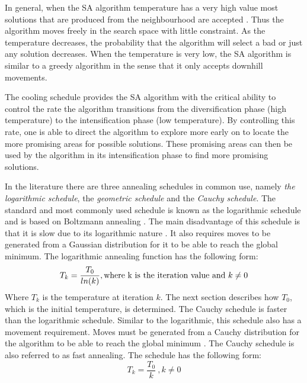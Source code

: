 In general, when the \gls{SA} algorithm temperature has a very high value most solutions that are produced from the neighbourhood are accepted \cite{ClusterSA}. Thus the algorithm moves freely in the search space with little constraint. As the temperature decreases, the probability that the algorithm will select a bad or just any solution decreases\cite{ClusterSA}. When the temperature is very low, the \gls{SA} algorithm is similar to a greedy algorithm in the sense that it only accepts downhill movements\cite{ClusterSA}.

The cooling schedule provides the \gls{SA} algorithm with the critical ability to control the rate the algorithm transitions from the diversification phase (high temperature) to the intensification phase (low temperature)\cite{ClusterSA}. By controlling this rate, one is able to direct the algorithm to explore more early on to locate the more promising areas for possible solutions. These promising areas can then be used by the algorithm in its intensification phase to find more promising solutions.

In the literature there are three annealing schedules in common use, namely \emph{the logarithmic schedule}, the \emph{geometric schedule} and the \emph{Cauchy schedule}\cite{VeryFastSAImageEnchancement,SASingleMultiObj}. 
The standard and most commonly used schedule is known as the logarithmic schedule and is based on Boltzmann annealing \cite{VeryFastSAImageEnchancement}. The main disadvantage of this schedule is that it is slow due to its logarithmic nature \cite{VeryFastSAImageEnchancement}. It also requires moves to be generated from a Gaussian distribution for it to be able to reach the global minimum\cite{SASingleMultiObj}. The logarithmic annealing function has the following form:
\begin{equation}
\label{eq:logcooling}
	T_k = \frac{T_0}{ln(k)},\text{where k is the iteration value and } k \neq 0\\
\end{equation}
Where $T_k$ is the temperature at iteration $k$. The next section describes how $T_0$, which is the initial temperature, is determined.
The Cauchy schedule is faster than the logarithmic schedule. Similar to the logarithmic, this schedule also has a movement requirement. Moves must be generated from a Cauchy distribution for the algorithm to be able to reach the global minimum \cite{SASingleMultiObj,VeryFastSAImageEnchancement}. The Cauchy schedule is also referred to as fast annealing\cite{VeryFastSAImageEnchancement}. The schedule has the following form:
\begin{equation}
\label{eq:cauchycooling}
	T_k = \frac{T_0}{k} ~, k \neq 0
\end{equation}

